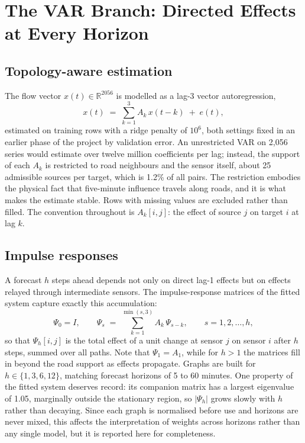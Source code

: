 \documentclass[MTech]{ugthesis}
\begin{document}
\section{The VAR Branch: Directed Effects at Every Horizon}
\label{sec:var}

\subsection{Topology-aware estimation}
The flow vector $x(t) \in \mathbb{R}^{2056}$ is modelled as a lag-3 vector autoregression,
\begin{equation}
x(t) \;=\; \sum_{k=1}^{3} A_k\, x(t-k) \;+\; e(t),
\label{eq:var}
\end{equation}
estimated on training rows with a ridge penalty of $10^{6}$, both settings fixed in an earlier phase of the project by validation error. An unrestricted VAR on 2,056 series would estimate over twelve million coefficients per lag; instead, the support of each $A_k$ is restricted to road neighbours and the sensor itself, about 25 admissible sources per target, which is 1.2\% of all pairs. The restriction embodies the physical fact that five-minute influence travels along roads, and it is what makes the estimate stable. Rows with missing values are excluded rather than filled. The convention throughout is $A_k[i,j]$: the effect of source $j$ on target $i$ at lag $k$.

\subsection{Impulse responses}
A forecast $h$ steps ahead depends not only on direct lag-1 effects but on effects relayed through intermediate sensors. The impulse-response matrices of the fitted system capture exactly this accumulation:
\begin{equation}
\Psi_0 = I, \qquad
\Psi_s \;=\; \sum_{k=1}^{\min(s,3)} A_k\, \Psi_{s-k}, \qquad s = 1, 2, \ldots, h,
\label{eq:irf}
\end{equation}
so that $\Psi_h[i,j]$ is the total effect of a unit change at sensor $j$ on sensor $i$ after $h$ steps, summed over all paths. Note that $\Psi_1 = A_1$, while for $h>1$ the matrices fill in beyond the road support as effects propagate. Graphs are built for $h \in \{1, 3, 6, 12\}$, matching forecast horizons of 5 to 60 minutes. One property of the fitted system deserves record: its companion matrix has a largest eigenvalue of 1.05, marginally outside the stationary region, so $|\Psi_h|$ grows slowly with $h$ rather than decaying. Since each graph is normalised before use and horizons are never mixed, this affects the interpretation of weights across horizons rather than any single model, but it is reported here for completeness.
\end{document}

